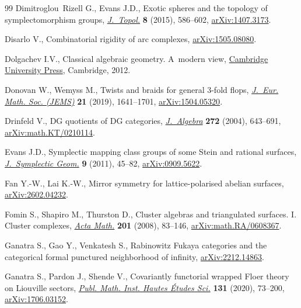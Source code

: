 \documentclass[10pt,a4paper]{amsart}
\theoremstyle{definition}
\numberwithin{equation}{section}
\begin{document}
\begin{thebibliography}{99}
Dimitroglou~Rizell G., Evans J.D., Exotic spheres and the topology of
 symplectomorphism groups,
 \href{https://doi.org/10.1112/jtopol/jtv007}{\textit{J.~Topol.}} \textbf{8}
 (2015), 586--602, \href{http://arxiv.org/abs/1407.3173}{arXiv:1407.3173}.

Disarlo V., Combinatorial rigidity of arc complexes,
 \href{http://arxiv.org/abs/1505.08080}{arXiv:1505.08080}.

Dolgachev I.V., Classical algebraic geometry. {A}~modern view,
 \href{https://doi.org/10.1017/CBO9781139084437}{Cambridge University Press},
 Cambridge, 2012.

Donovan W., Wemyss M., Twists and braids for general 3-fold flops,
 \href{https://doi.org/10.4171/JEMS/868}{\textit{J.~Eur. Math. Soc. (JEMS)}}
 \textbf{21} (2019), 1641--1701,
 \href{http://arxiv.org/abs/1504.05320}{arXiv:1504.05320}.

Drinfeld V., D{G} quotients of {DG} categories,
 \href{https://doi.org/10.1016/j.jalgebra.2003.05.001}{\textit{J.~Algebra}}
 \textbf{272} (2004), 643--691,
 \href{http://arxiv.org/abs/math.KT/0210114}{arXiv:math.KT/0210114}.

Evans J.D., Symplectic mapping class groups of some {S}tein and rational
 surfaces,
 \href{https://doi.org/10.4310/jsg.2011.v9.n1.a4}{\textit{J.~Symplectic
 Geom.}} \textbf{9} (2011), 45--82,
 \href{http://arxiv.org/abs/0909.5622}{arXiv:0909.5622}.

Fan Y.-W., Lai K.-W., Mirror symmetry for lattice-polarised abelian surfaces,
 \href{http://arxiv.org/abs/2602.04232}{arXiv:2602.04232}.

Fomin S., Shapiro M., Thurston D., Cluster algebras and triangulated surfaces.
 {I}. {C}luster complexes,
 \href{https://doi.org/10.1007/s11511-008-0030-7}{\textit{Acta Math.}}
 \textbf{201} (2008), 83--146,
 \href{http://arxiv.org/abs/math.RA/0608367}{arXiv:math.RA/0608367}.

Ganatra S., Gao Y., Venkatesh S., Rabinowitz {F}ukaya categories and the
 categorical formal punctured neighborhood of infinity,
 \href{http://arxiv.org/abs/2212.14863}{arXiv:2212.14863}.

Ganatra S., Pardon J., Shende V., Covariantly functorial wrapped {F}loer theory
 on {L}iouville sectors,
 \href{https://doi.org/10.1007/s10240-019-00112-x}{\textit{Publ. Math. Inst.
 Hautes \'{E}tudes Sci.}} \textbf{131} (2020), 73--200,
 \href{http://arxiv.org/abs/1706.03152}{arXiv:1706.03152}.


\end{thebibliography}
\end{document}
